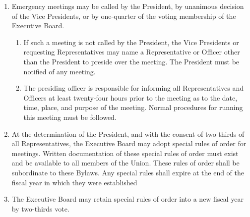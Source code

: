 \documentclass{uniondoc}
\begin{document}
\begin{enumerate}
\begin{enumerate}
  \item In the event of a vacancy or extended absence of the Director, the President shall ask a member of the Union administrative staff to fulfill this responsibility.
  \item The President may remove any person who is disrupting a meeting.
    \begin{enumerate}
    \item The President’s decision may be overruled by the objection of any Representative.
    \end{enumerate}
  \item At any time, any member of the Executive Board may call for a vote to remove a person from a meeting. This requires a two-thirds vote of the Board and, if successful, cannot be overruled.
  \end{enumerate}
\item Emergency meetings may be called by the President, by unanimous decision of the Vice Presidents, or by one-quarter of the voting membership of the Executive Board.
  \begin{enumerate}
  \item If such a meeting is not called by the President, the Vice Presidents or requesting Representatives may name a Representative or Officer other than the President to preside over the meeting. The President must be notified of any meeting.
  \item The presiding officer is responsible for informing all Representatives and Officers at least twenty-four hours prior to the meeting as to the date, time, place, and purpose of the meeting. Normal procedures for running this meeting must be followed.
  \end{enumerate}
\item At the determination of the President, and with the consent of two-thirds of all Representatives, the Executive Board may adopt special rules of order for meetings. Written documentation of these special rules of order must exist and be available to all members of the Union. These rules of order shall be subordinate to these Bylaws. Any special rules shall expire at the end of the fiscal year in which they were established
\item The Executive Board may retain special rules of order into a new fiscal year by two-thirds vote.
\end{enumerate}

\end{document}
